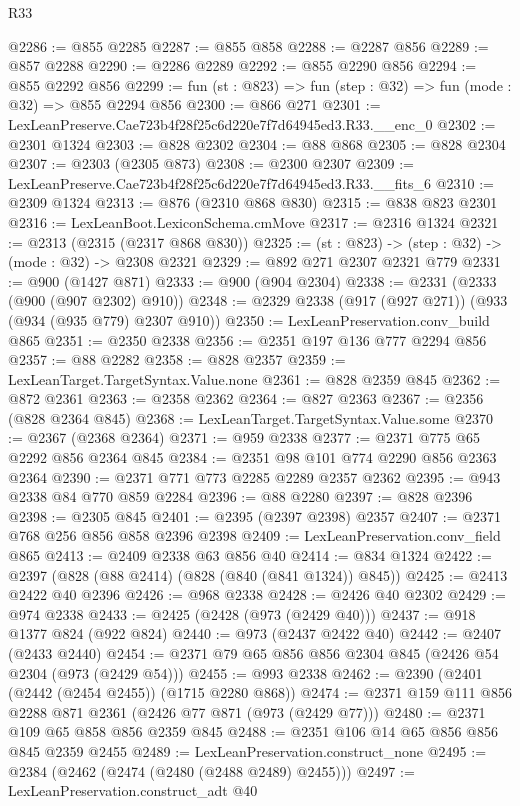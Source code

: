 \begin{lexlean}{R33}
\begin{coremodule}
@2286 := @855 @2285
@2287 := @855 @858
@2288 := @2287 @856
@2289 := @857 @2288
@2290 := @2286 @2289
@2292 := @855 @2290 @856
@2294 := @855 @2292 @856
@2299 := fun (st : @823) => fun (step : @32) => fun (mode : @32) => @855 @2294 @856
@2300 := @866 @271
@2301 := LexLeanPreserve.Cae723b4f28f25c6d220e7f7d64945ed3.R33.__enc_0
@2302 := @2301 @1324
@2303 := @828 @2302
@2304 := @88 @868
@2305 := @828 @2304
@2307 := @2303 (@2305 @873)
@2308 := @2300 @2307
@2309 := LexLeanPreserve.Cae723b4f28f25c6d220e7f7d64945ed3.R33.__fits_6
@2310 := @2309 @1324
@2313 := @876 (@2310 @868 @830)
@2315 := @838 @823 @2301
@2316 := LexLeanBoot.LexiconSchema.cmMove
@2317 := @2316 @1324
@2321 := @2313 (@2315 (@2317 @868 @830))
@2325 := (st : @823) -> (step : @32) -> (mode : @32) -> @2308 @2321
@2329 := @892 @271 @2307 @2321 @779
@2331 := @900 (@1427 @871)
@2333 := @900 (@904 @2304)
@2338 := @2331 (@2333 (@900 (@907 @2302) @910))
@2348 := @2329 @2338 (@917 (@927 @271)) (@933 (@934 (@935 @779) @2307 @910))
@2350 := LexLeanPreservation.conv_build @865
@2351 := @2350 @2338
@2356 := @2351 @197 @136 @777 @2294 @856
@2357 := @88 @2282
@2358 := @828 @2357
@2359 := LexLeanTarget.TargetSyntax.Value.none
@2361 := @828 @2359 @845
@2362 := @872 @2361
@2363 := @2358 @2362
@2364 := @827 @2363
@2367 := @2356 (@828 @2364 @845)
@2368 := LexLeanTarget.TargetSyntax.Value.some
@2370 := @2367 (@2368 @2364)
@2371 := @959 @2338
@2377 := @2371 @775 @65 @2292 @856 @2364 @845
@2384 := @2351 @98 @101 @774 @2290 @856 @2363 @2364
@2390 := @2371 @771 @773 @2285 @2289 @2357 @2362
@2395 := @943 @2338 @84 @770 @859 @2284
@2396 := @88 @2280
@2397 := @828 @2396
@2398 := @2305 @845
@2401 := @2395 (@2397 @2398) @2357
@2407 := @2371 @768 @256 @856 @858 @2396 @2398
@2409 := LexLeanPreservation.conv_field @865
@2413 := @2409 @2338 @63 @856 @40
@2414 := @834 @1324
@2422 := @2397 (@828 (@88 @2414) (@828 (@840 (@841 @1324)) @845))
@2425 := @2413 @2422 @40 @2396
@2426 := @968 @2338
@2428 := @2426 @40 @2302
@2429 := @974 @2338
@2433 := @2425 (@2428 (@973 (@2429 @40)))
@2437 := @918 @1377 @824 (@922 @824)
@2440 := @973 (@2437 @2422 @40)
@2442 := @2407 (@2433 @2440)
@2454 := @2371 @79 @65 @856 @856 @2304 @845 (@2426 @54 @2304 (@973 (@2429 @54)))
@2455 := @993 @2338
@2462 := @2390 (@2401 (@2442 (@2454 @2455)) (@1715 @2280 @868))
@2474 := @2371 @159 @111 @856 @2288 @871 @2361 (@2426 @77 @871 (@973 (@2429 @77)))
@2480 := @2371 @109 @65 @858 @856 @2359 @845
@2488 := @2351 @106 @14 @65 @856 @856 @845 @2359 @2455
@2489 := LexLeanPreservation.construct_none
@2495 := @2384 (@2462 (@2474 (@2480 (@2488 @2489) @2455)))
@2497 := LexLeanPreservation.construct_adt @40

\end{coremodule}
\end{lexlean}
